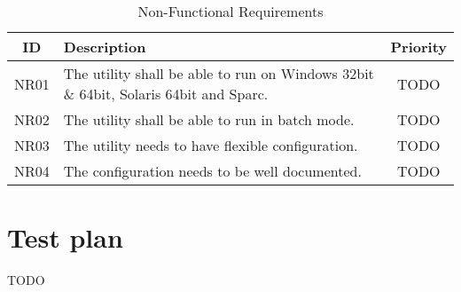 \begin{table}[h] \center
\caption{Non-Functional Requirements\label{tab:nonfuncreq}}
\begin{tabular}{| c | p{9cm} | c |}
	\hline ID & Description & Priority \\
	\hline NR01 & The utility shall be able to run on Windows 32bit \& 64bit,
		Solaris 64bit and Sparc. & TODO \\
	\hline NR02 & The utility shall be able to run in batch mode. & TODO \\
	\hline NR03 & The utility needs to have flexible configuration. & TODO \\
	\hline NR04 & The configuration needs to be well documented. & TODO \\
	\hline
\end{tabular}
\end{table}

\chapter{Test plan}
TODO

